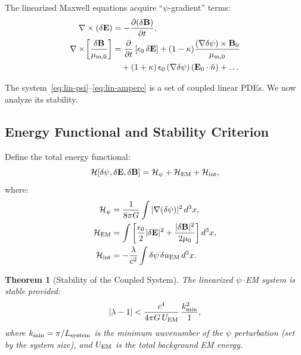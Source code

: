 \documentclass[aps,prd,twocolumn,superscriptaddress,floatfix,nofootinbib]{revtex4-2}
\newcommand{\lam}{\lambda}
\newcommand{\kap}{\kappa}
\newtheorem{theorem}{Theorem}
\begin{document}
The linearized Maxwell equations acquire ``$\psi$-gradient'' terms:
\begin{align}
\nabla\times(\delta\mathbf{E})
&= -\frac{\partial(\delta\mathbf{B})}{\partial t},
\label{eq:lin-faraday} \\
\nabla\times\!\left[\frac{\delta\mathbf{B}}{\mu_{\rm m,0}}\right]
&= \frac{\partial}{\partial t}\left[\epsilon_0\,\delta\mathbf{E}\right]
+ (1-\kap)\frac{(\nabla\delta\psi)\times\mathbf{B}_0}{\mu_{\rm m,0}}
\notag\\
&\quad + (1+\kap)\,\epsilon_0\,(\nabla\delta\psi)\,
(\mathbf{E}_0\cdot\hat{n}) + \ldots
\label{eq:lin-ampere}
\end{align}

The system~\eqref{eq:lin-psi}--\eqref{eq:lin-ampere} is a set of
coupled linear PDEs. We now analyze its stability.

\subsection{Energy Functional and Stability Criterion}
\label{sec:stability}

Define the total energy functional:
\begin{equation}
\mathcal{H}[\delta\psi, \delta\mathbf{E}, \delta\mathbf{B}]
= \mathcal{H}_\psi + \mathcal{H}_{\rm EM} + \mathcal{H}_{\rm int},
\end{equation}
where:
\begin{align}
\mathcal{H}_\psi &= \frac{1}{8\pi G}\int |\nabla(\delta\psi)|^2\,d^3x,
\label{eq:H-psi}\\
\mathcal{H}_{\rm EM} &= \int\left[
  \frac{\epsilon_0}{2}|\delta\mathbf{E}|^2
  + \frac{|\delta\mathbf{B}|^2}{2\mu_0}\right]d^3x,
\label{eq:H-EM}\\
\mathcal{H}_{\rm int} &= -\frac{\lam}{c^2}\int\delta\psi\,
\delta u_{\rm EM}\,d^3x.
\label{eq:H-int}
\end{align}

\begin{theorem}[Stability of the Coupled System]
The linearized $\psi$--EM system is stable provided:
\begin{equation}
|\lam - 1| < \frac{c^4}{4\pi G\,U_{\rm EM}}\,
\frac{k_{\rm min}^2}{1},
\label{eq:stability-criterion}
\end{equation}
where $k_{\rm min} = \pi/L_{\rm system}$ is the minimum wavenumber
of the $\psi$ perturbation (set by the system size), and $U_{\rm EM}$
is the total background EM energy.
\end{theorem}
\end{document}
